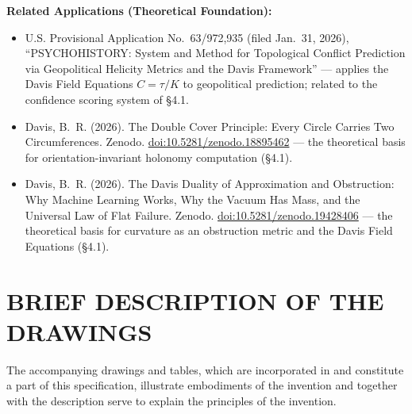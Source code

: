 \documentclass[11pt,letterpaper]{article}
\begin{document}
\textbf{Related Applications (Theoretical Foundation):}
\begin{itemize}[nosep]
  \item U.S. Provisional Application No.~63/972,935 (filed Jan.~31, 2026), ``PSYCHOHISTORY: System and Method for Topological Conflict Prediction via Geopolitical Helicity Metrics and the Davis Framework'' --- applies the Davis Field Equations $C = \tau/K$ to geopolitical prediction; related to the confidence scoring system of \S4.1.
  \item Davis, B.~R. (2026). The Double Cover Principle: Every Circle Carries Two Circumferences. Zenodo. \href{https://doi.org/10.5281/zenodo.18895462}{doi:10.5281/zenodo.18895462} --- the theoretical basis for orientation-invariant holonomy computation (\S4.1).
  \item Davis, B.~R. (2026). The Davis Duality of Approximation and Obstruction: Why Machine Learning Works, Why the Vacuum Has Mass, and the Universal Law of Flat Failure. Zenodo. \href{https://doi.org/10.5281/zenodo.19428406}{doi:10.5281/zenodo.19428406} --- the theoretical basis for curvature as an obstruction metric and the Davis Field Equations (\S4.1).
\end{itemize}


\newpage
\section*{BRIEF DESCRIPTION OF THE DRAWINGS}

The accompanying drawings and tables, which are incorporated in and constitute a
part of this specification, illustrate embodiments of the invention and together
with the description serve to explain the principles of the invention.
\end{document}
